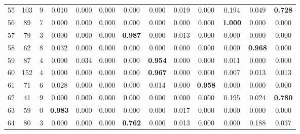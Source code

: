 \documentclass[a4paper,fleqn,usenatbib]{mnras}
\begin{document}
\begin{table*}
\begin{tabular}{|c|c|c|c|c|c|c|c|c|c|c|c|c|}
55 & 103 & 9 & 0.010 & 0.000 & 0.000 & 0.000 & 0.000 & 0.019 & 0.000 & 0.194 & 0.049 & \textbf{0.728}\\
56 & 89 & 7 & 0.000 & 0.000 & 0.000 & 0.000 & 0.000 & 0.000 & 0.000 & \textbf{1.000} & 0.000 & 0.000\\
57 & 79 & 3 & 0.000 & 0.000 & 0.000 & \textbf{0.987} & 0.000 & 0.013 & 0.000 & 0.000 & 0.000 & 0.000\\
58 & 62 & 8 & 0.032 & 0.000 & 0.000 & 0.000 & 0.000 & 0.000 & 0.000 & 0.000 & \textbf{0.968} & 0.000\\
59 & 87 & 4 & 0.000 & 0.034 & 0.000 & 0.000 & \textbf{0.954} & 0.000 & 0.000 & 0.011 & 0.000 & 0.000\\
60 & 152 & 4 & 0.000 & 0.000 & 0.000 & 0.000 & \textbf{0.967} & 0.000 & 0.000 & 0.007 & 0.013 & 0.013\\
61 & 71 & 6 & 0.028 & 0.000 & 0.000 & 0.000 & 0.014 & 0.000 & \textbf{0.958} & 0.000 & 0.000 & 0.000\\
62 & 41 & 9 & 0.000 & 0.000 & 0.000 & 0.000 & 0.000 & 0.000 & 0.000 & 0.195 & 0.024 & \textbf{0.780}\\
63 & 59 & 0 & \textbf{0.983} & 0.000 & 0.000 & 0.000 & 0.000 & 0.017 & 0.000 & 0.000 & 0.000 & 0.000\\
64 & 80 & 3 & 0.000 & 0.000 & 0.000 & \textbf{0.762} & 0.000 & 0.013 & 0.000 & 0.000 & 0.188 & 0.037\\
\hline
\end{tabular}
\caption{}
\label{tab:mnist_clustering_1}
\end{table*}
\end{document}
